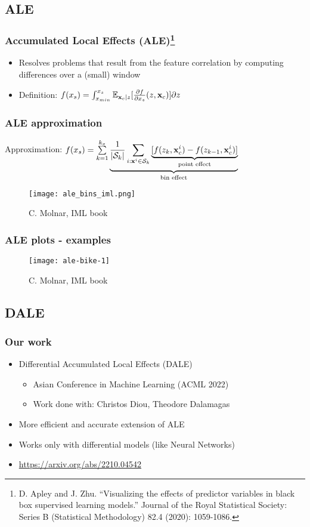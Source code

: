 \subsection{ALE}
\begin{frame}
 \frametitle{Accumulated Local Effects (ALE)\footnote{D. Apley and
   J. Zhu. ``Visualizing the effects of predictor variables in black box
   supervised learning models.'' Journal of the Royal Statistical Society:
   Series B (Statistical Methodology) 82.4 (2020): 1059-1086.}}

 \begin{itemize}
 \item Resolves problems that result from the feature correlation by computing
   differences over a (small) window
 \item Definition: \(f(x_s) = \int_{x_{min}}^{x_s}\mathbb{E}_{\mathbf{x}_c|z}[ \frac{\partial f}{\partial x_s}(z, \mathbf{x}_c)] \partial z\)
 \end{itemize}
\end{frame}

\begin{frame}
 \frametitle{ALE approximation}
 Approximation: \(f(x_s) = \sum\limits_{k=1}^{k_x}
 \underbrace{\frac{1}{|\mathcal{S}_k|} \sum_{i:\mathbf{x}^i \in \mathcal{S}_k}
   \underbrace{[f(z_k, \mathbf{x}^i_c) - f(z_{k-1}, \mathbf{x}^i_c)]}_{\text{point
       effect}}}_{\text{bin effect}} \)

 \begin{figure}[ht]
   \centering
   \texttt{[image: ale\_bins\_iml.png]}
   \caption{\footnotesize C. Molnar, IML book}
 \end{figure}
\end{frame}

\begin{frame}
 \frametitle{ALE plots - examples}
 \begin{figure}
   \texttt{[image: ale-bike-1]}
   \caption{\footnotesize C. Molnar, IML book}
 \end{figure}
\end{frame}

\subsection{DALE}
\begin{frame}
  \frametitle{Our work}

  \begin{itemize}
  \item Differential Accumulated Local Effects (DALE)
    \begin{itemize}
    \item Asian Conference in Machine Learning (ACML 2022)
    \item Work done with: Christos Diou, Theodore Dalamagas
    \end{itemize}
  \item More efficient and accurate extension of ALE
  \item Works only with differential models (like Neural Networks)
  \item \href{https://arxiv.org/abs/2210.04542}{https://arxiv.org/abs/2210.04542}
  \end{itemize}
\end{frame}


